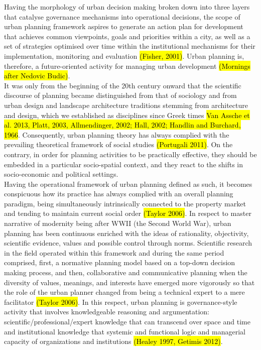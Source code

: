 \documentclass[11pt]{report}
\begin{document}
Having the morphology of urban decision making broken down into three layers that catalyse governance mechanisms into operational decisions, the scope of urban  planning  framework aspires  to  generate  an  action  plan  for  development  that  achieves  common 
viewpoints,  goals  and  priorities  within  a city,  as  well  as  a  set  of  strategies  optimised  over  time  within  the institutional mechanisms for their implementation, monitoring and evaluation \hl{(Fisher, 2001)}.
Urban planning is, therefore, a future-oriented activity for managing urban development \hl{(Mornings after Nedovic Budic)}. 
\\
It was only from the beginning of the 20th century onward that the scientific discourse of planning became distinguished from that of sociology and from urban design and landscape architecture traditions stemming from architecture and design, which we established as disciplines since Greek times \hl{Van Assche et al. 2013, Platt, 2003, Allmendinger, 2002; Hall, 2002; Handlin and Burchard, 1966}. 
Consequently, urban planning theory has always complied with the prevailing theoretical framework of social studies \hl{(Portugali 2011)}.
On the contrary, in order for planning activities to be practically effective, they should be embedded in a particular socio-spatial context, and they react to the shifts in socio-economic and political settings.
\\
Having the operational framework of urban planning defined as such, it becomes conspicuous how its practice has always complied with an overall planning paradigm, being simultaneously  intrinsically  connected to the property  market and tending to maintain current social order \hl{(Taylor 2006)}. 
In respect to master narrative of modernity being after WWII (the Second World War), urban planning has been continuous enriched with the ideas of rationality, objectivity, scientific evidence, values and possible control through norms. 
Scientific  research  in  the  field  operated  within  this  framework  and  during  the  same  period  comprised,  first,  a  normative planning model based on a top-down decision making process, and then, collaborative and communicative planning when 
the diversity of values, meanings, and interests have emerged more vigorously so that the role of the urban planner changed 
from being a technical expert to a mere facilitator \hl{(Taylor 2006)}.
In this respect, urban planning is governance-style activity that involves knowledgeable reasoning and argumentation: scientific/professional/expert knowledge that can transcend over space and time and institutional knowledge that systemic and functional logic and managerial capacity of organizations and institutions \hl{(Healey 1997, Getimis 2012)}.
\end{document}
